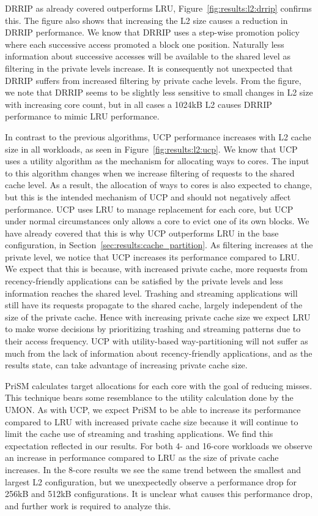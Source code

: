 DRRIP as already covered outperforms LRU, Figure~\ref{fig:results:l2:drrip} confirms this.
The figure also shows that increasing the L2 size causes a reduction in DRRIP performance.
We know that DRRIP uses a step-wise promotion policy where each successive access promoted a block one position.
Naturally less information about successive accesses will be available to the shared level as filtering in the private levels increase.
It is consequently not unexpected that DRRIP suffers from increased filtering by private cache levels.
From the figure, we note that DRRIP seems to be slightly less sensitive to small changes in L2 size with increasing core count, but in all cases a 1024kB L2 causes DRRIP performance to mimic LRU performance.

In contrast to the previous algorithms, UCP performance increases with L2 cache size in all workloads, as seen in Figure~\ref{fig:results:l2:ucp}.
We know that UCP uses a utility algorithm as the mechanism for allocating ways to cores. 
The input to this algorithm changes when we increase filtering of requests to the shared cache level.
As a result, the allocation of ways to cores is also expected to change, but this is the intended mechanism of UCP and should not negatively affect performance.
UCP uses LRU to manage replacement for each core, but UCP under normal circumstances only allows a core to evict one of its own blocks. 
We have already covered that this is why UCP outperforms LRU in the base configuration, in Section~\ref{sec:results:cache_partition}. 
As filtering increases at the private level, we notice that UCP increases its performance compared to LRU. 
We expect that this is because, with increased private cache, more requests from recency-friendly applications can be satisfied by the private levels and less information reaches the shared level.
Trashing and streaming applications will still have its requests propagate to the shared cache, largely independent of the size of the private cache. 
Hence with increasing private cache size we expect LRU to make worse decisions by prioritizing trashing and streaming patterns due to their access frequency.
UCP with utility-based way-partitioning will not suffer as much from the lack of information about recency-friendly applications, and as the results state, can take advantage of increasing private cache size.

PriSM calculates target allocations for each core with the goal of reducing misses.
This technique bears some resemblance to the utility calculation done by the UMON.
As with UCP, we expect PriSM to be able to increase its performance compared to LRU with increased private cache size because it will continue to limit the cache use of streaming and trashing applications.
We find this expectation reflected in our results.
For both 4- and 16-core workloads we observe an increase in performance compared to LRU as the size of private cache increases.
In the 8-core results we see the same trend between the smallest and largest L2 configuration, but we unexpectedly observe a performance drop for 256kB and 512kB configurations. 
It is unclear what causes this performance drop, and further work is required to analyze this.

